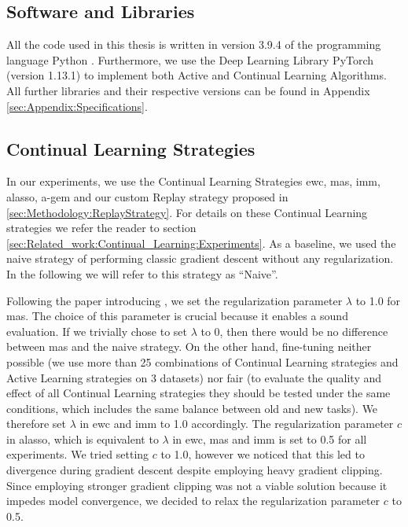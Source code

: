 \subsection{Software and Libraries}
\label{sec:ExperimentSetup:Software}
All the code used in this thesis is written in version 3.9.4 of the programming language Python \cite{Rossum1995Python}. Furthermore, we use the Deep
Learning Library PyTorch \cite{paszke2019pytorch} (version 1.13.1) to implement both Active and Continual Learning Algorithms. All further libraries
and their respective versions can be found in Appendix \ref{sec:Appendix:Specifications}.

\subsection{Continual Learning Strategies}
\label{sec:ExperimentSetup:CLStrategies}
In our experiments, we use the Continual Learning Strategies \gls{ewc}, \gls{mas}, \gls{imm}, \gls{alasso}, \gls{a-gem} and our custom Replay strategy
proposed in \ref{sec:Methodology:ReplayStrategy}. For details on these Continual Learning strategies we refer the reader to section 
\ref{sec:Related_work:Continual_Learning:Experiments}. As a baseline, we used the naive strategy of performing classic gradient descent without any
regularization. In the following we will refer to this strategy as \enquote{Naive}. \par
Following the paper introducing \cite{mas} \cite{aljundi2018memory}, we set the regularization parameter $\lambda$ to 1.0 for \gls{mas}. The choice of
this parameter is crucial because it enables a sound evaluation. If we trivially chose to set $\lambda$ to 0, then there would be no difference between
\gls{mas} and the naive strategy. On the other hand, fine-tuning neither possible (we use more than 25 combinations of Continual Learning strategies and
Active Learning strategies on 3 datasets) nor fair (to evaluate the quality and effect of all Continual Learning strategies they should be tested under
the same conditions, which includes the same balance between old and new tasks). We therefore set $\lambda$ in \gls{ewc} and \gls{imm} to 1.0 accordingly.
The regularization parameter $c$ in \gls{alasso}, which is equivalent to $\lambda$ in \gls{ewc}, \gls{mas} and \gls{imm} is set to 0.5 for all experiments.
We tried setting $c$ to 1.0, however we noticed that this led to divergence during gradient descent despite employing heavy gradient clipping. Since employing
stronger gradient clipping was not a viable solution because it impedes model convergence, we decided to relax the regularization parameter $c$ to 0.5. \par
